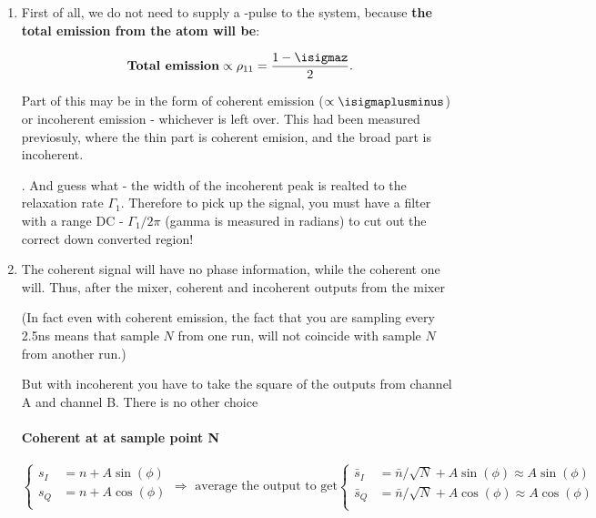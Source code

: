  \begin{enumerate}
 	\item First of all, we do not need to supply a \xpi-pulse to the system, because \textbf{the total emission from the atom will be}:
 	
 	\[
 		\text{\textbf{Total emission}} \propto \rho_{11} = \frac{1-\isigmaz}{2}.
 	\]
 	
 	\noindent Part of this may be in the form of coherent emission ($ \propto \isigmaplusminus $) or incoherent emission - whichever is left over. This had been measured previosuly, where the thin part is coherent emision, and the broad part is incoherent.
 	
 	
 	. And guess what - the width of the incoherent peak is realted to the relaxation rate $ \Gamma_1 $. Therefore to pick up the signal, you must have a filter with a range DC - $ \Gamma_1/2\pi $ (gamma is measured in radians) to cut out the correct down converted region!
 	
 	\item The coherent signal will have no phase information, while the coherent one will. Thus, after the mixer, coherent and incoherent outputs from the mixer
 	

 	(In fact even with coherent emission, the fact that you are sampling every 2.5ns means that sample $ N $ from one run, will not coincide with sample $ N $ from another run.) 
 	
 	But with incoherent you have to take the square of the outputs from channel A and channel B. There is no other choice
 	
 	\paragraph{Coherent at at sample point N}
 	\[
 	\left\lbrace\begin{aligned}
 	s_I &= n + A\sin(\phi)\\
 	s_Q &= n + A\cos(\phi)\\
 	\end{aligned}\right.\Rightarrow
 	\text{ average the output to get}
 	\left\lbrace\begin{aligned}
 	\bar{s}_I &= \bar{n}/\sqrt{N} + A\sin(\phi) \approx A\sin(\phi)\\
 	\bar{s}_Q &= \bar{n}/\sqrt{N} + A\cos(\phi) \approx A\cos(\phi)\\
 	\end{aligned}\right.
 	\]
 	

\end{enumerate}
